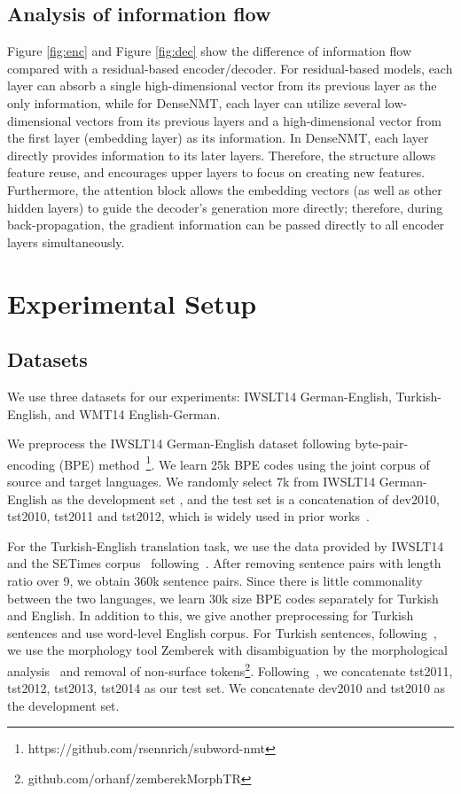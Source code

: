 \documentclass[11pt,a4paper]{article}
\begin{document}
\subsection{Analysis of information flow}
Figure \ref{fig:enc} and Figure \ref{fig:dec} show the difference of information flow compared with a residual-based encoder/decoder. For residual-based models, each layer can absorb a single high-dimensional vector from its previous layer as the only information, while for DenseNMT, each layer can utilize several low-dimensional vectors  from its previous layers and a high-dimensional vector from the first layer (embedding layer) as its information. 
In DenseNMT, each layer directly provides information to its later layers. 
Therefore, the structure allows feature reuse, and encourages upper layers to focus on creating new features. 
Furthermore, the attention block allows the embedding vectors (as well as other hidden layers) to guide the decoder's generation more directly; therefore, during back-propagation, the gradient information can be passed directly to all encoder layers simultaneously. 


\section{Experimental Setup}


\subsection{Datasets}


We use three datasets for our experiments: IWSLT14 German-English, Turkish-English, and WMT14 English-German. 

We preprocess the IWSLT14 German-English dataset following byte-pair-encoding (BPE) method~\cite{subword}\footnote{https://github.com/rsennrich/subword-nmt}. We learn 25k BPE codes using the joint corpus of source and target languages. 
We randomly select 7k from IWSLT14 German-English  as the development set
, and the test set is a concatenation of dev2010, tst2010, tst2011 and tst2012, which is widely used in prior works~\cite{ranzato2015sequence,bahdanau2016actor,msrphrase}.



For the Turkish-English translation task, we use the data provided by IWSLT14~\cite{cettolo2014report} and the SETimes corpus~\cite{cettolo2014report} following~\cite{sennrich2015improving}. After removing sentence pairs with  length ratio over 9, we obtain 360k sentence pairs. Since there is little commonality between the two languages, we learn 30k size BPE codes separately for Turkish and English. 
In addition to this, we give another preprocessing for Turkish sentences and use word-level English corpus. 
For Turkish sentences, following~\cite{gulcehre2015using,sennrich2015improving}, we use the morphology tool Zemberek with disambiguation by the morphological analysis~\cite{sak2007morphological} and removal of non-surface tokens\footnote{github.com/orhanf/zemberekMorphTR}. 
Following~\cite{sennrich2015improving}, we concatenate tst2011, tst2012, tst2013, tst2014 as our test set. We concatenate dev2010 and tst2010 as the development set.
\end{document}
